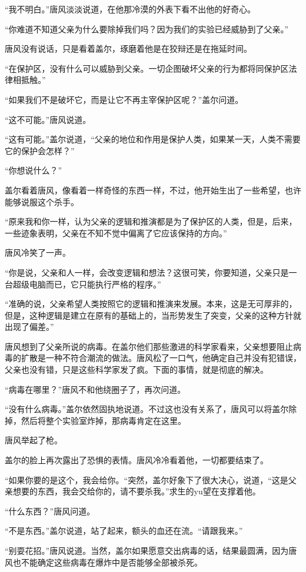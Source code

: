 “我不明白。”唐风淡淡说道，在他那冷漠的外表下看不出他的好奇心。

“你难道不知道父亲为什么要除掉我们吗？因为我们的实验已经威胁到了父亲。”

唐风没有说话，只是看着盖尔，琢磨着他是在狡辩还是在拖延时间。

“在保护区，没有什么可以威胁到父亲。一切企图破坏父亲的行为都将同保护区法律相抵触。”

“如果我们不是破坏它，而是让它不再主宰保护区呢？”盖尔问道。

“这不可能。”唐风说道。

“这有可能。”盖尔说道，“父亲的地位和作用是保护人类，如果某一天，人类不需要它的保护会怎样？”

“你想说什么？”

盖尔看着唐风，像看着一样奇怪的东西一样，不过，他开始生出了一些希望，也许能够说服这个杀手。

“原来我和你一样，认为父亲的逻辑和推演都是为了保护区的人类，但是，后来，一些迹象表明，父亲在不知不觉中偏离了它应该保持的方向。”

唐风冷笑了一声。

“你是说，父亲和人一样，会改变逻辑和想法？这很可笑，你要知道，父亲只是一台超级电脑而已，它只能执行严格的程序。”

“准确的说，父亲希望人类按照它的逻辑和推演来发展。本来，这是无可厚非的，但是，这种逻辑是建立在原有的基础上的，当形势发生了突变，父亲的这种方针就出现了偏差。”

唐风想到了父亲所说的病毒。在盖尔他们那些激进的科学家看来，父亲想要阻止病毒的扩散是一种不符合潮流的做法。唐风松了一口气，他确定自己并没有犯错误，父亲也没有错，只是这些科学家发了疯。下面的事情，就是彻底的解决。

“病毒在哪里？”唐风不和他绕圈子了，再次问道。

“没有什么病毒。”盖尔依然固执地说道。不过这也没有关系了，唐风可以将盖尔除掉，然后将整个实验室炸掉，那病毒肯定在这里。

唐风举起了枪。

盖尔的脸上再次露出了恐惧的表情。唐风冷冷看着他，一切都要结束了。

“如果你要的是这个，我会给你。“突然，盖尔好象下了很大决心，说道，“这是父亲想要的东西，我会交给你的，请不要杀我。”求生的yu望在支撑着他。

“什么东西？”唐风问道。

“不是东西。”盖尔说道，站了起来，额头的血还在流。“请跟我来。”

“别耍花招。”唐风说道。当然，盖尔如果愿意交出病毒的话，结果最圆满，因为唐风也不能确定这些病毒在爆炸中是否能够全部被杀死。

